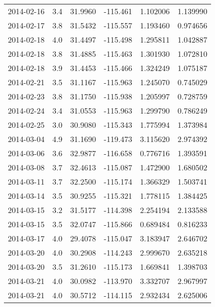 \begin{tabular}{lrrrrr}
2014-02-16 &       3.4 &  31.9960 &  -115.461 &         1.102006 &         1.139990 \\
2014-02-17 &       3.8 &  31.5432 &  -115.557 &         1.193460 &         0.974656 \\
2014-02-18 &       4.0 &  31.4497 &  -115.498 &         1.295811 &         1.042887 \\
2014-02-18 &       3.8 &  31.4885 &  -115.463 &         1.301930 &         1.072810 \\
2014-02-18 &       3.9 &  31.4453 &  -115.466 &         1.324249 &         1.075187 \\
2014-02-21 &       3.5 &  31.1167 &  -115.963 &         1.245070 &         0.745029 \\
2014-02-23 &       3.8 &  31.1750 &  -115.938 &         1.205997 &         0.728759 \\
2014-02-24 &       3.4 &  31.0553 &  -115.963 &         1.299790 &         0.786249 \\
2014-02-25 &       3.0 &  30.9080 &  -115.343 &         1.775994 &         1.373984 \\
2014-03-04 &       4.9 &  31.1690 &  -119.473 &         3.115620 &         2.974392 \\
2014-03-06 &       3.6 &  32.9877 &  -116.658 &         0.776716 &         1.393591 \\
2014-03-08 &       3.7 &  32.4613 &  -115.087 &         1.472900 &         1.680502 \\
2014-03-11 &       3.7 &  32.2500 &  -115.174 &         1.366329 &         1.503741 \\
2014-03-14 &       3.5 &  30.9255 &  -115.321 &         1.778115 &         1.384425 \\
2014-03-15 &       3.2 &  31.5177 &  -114.398 &         2.254194 &         2.133588 \\
2014-03-15 &       3.5 &  32.0747 &  -115.866 &         0.689484 &         0.816233 \\
2014-03-17 &       4.0 &  29.4078 &  -115.047 &         3.183947 &         2.646702 \\
2014-03-20 &       4.0 &  30.2908 &  -114.243 &         2.999670 &         2.635218 \\
2014-03-20 &       3.5 &  31.2610 &  -115.173 &         1.669841 &         1.398703 \\
2014-03-21 &       4.0 &  30.0982 &  -113.970 &         3.332707 &         2.967997 \\
2014-03-21 &       4.0 &  30.5712 &  -114.115 &         2.932434 &         2.625006 \\

\end{tabular}
